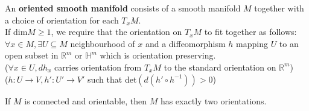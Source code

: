 \begin{definition}\label{9.2}
    An \textbf{oriented smooth manifold} consists of a smooth manifold $M$ together with a choice of orientation for each $T_xM$.\\
    If dim$M\geq 1$, we require that the orientation on $T_xM$ to fit together as follows:\\
    $\forall x\in M,\exists U\subseteq M$ neighbourhood of $x$ and a diffeomorphism $h$ mapping $U$ to an open subset in $\mathbb{R}^m$ or $\mathbb{H}^m$ which is orientation preserving.\\
    ($\forall x\in U, dh_x$ carries orientation from $T_xM$ to the standard orientation on $\mathbb{R}^m$)\\
    ($h:U\to V, h':U'\to V'$ such that det$(d(h'\circ h^{-1}))>0$)
\end{definition}
\begin{remark}\label{9.3}
    If $M$ is connected and orientable, then $M$ has exactly two orientations.
\end{remark}
